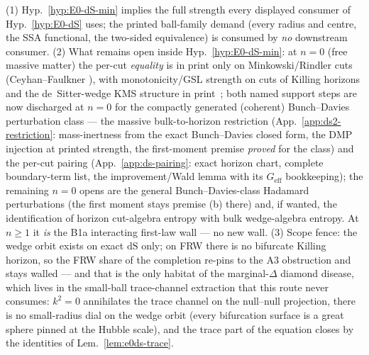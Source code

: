 \begin{remark}
\label{rem:e0ds-min-status}
(1) Hyp.~\ref{hyp:E0-dS-min} implies the full strength every
displayed consumer of Hyp.~\ref{hyp:E0-dS} uses; the printed
ball-family demand (every radius and centre, the SSA functional,
the two-sided equivalence) is consumed by \emph{no} downstream
consumer. (2) What remains open inside Hyp.~\ref{hyp:E0-dS-min}: at
$n{=}0$ (free massive matter) the per-cut \emph{equality} is in
print only on Minkowski/Rindler cuts (Ceyhan--Faulkner
\cite{CeyhanFaulkner2018}), with monotonicity/GSL strength on cuts
of Killing horizons \cite{FaulknerSperanza2024} and the
de~Sitter-wedge KMS structure in
print~\cite{BorchersBuchholz1999}; both named support steps are now
discharged at $n{=}0$ for the compactly generated (coherent)
Bunch--Davies perturbation class --- the massive bulk-to-horizon
restriction (App.~\ref{app:ds2-restriction}: mass-inertness from
the exact Bunch--Davies closed form, the DMP injection at printed
strength, the first-moment premise \emph{proved} for the class)
and the per-cut pairing (App.~\ref{app:ds-pairing}: exact horizon
chart, complete boundary-term list, the improvement/Wald lemma
with its $G_{\mathrm{eff}}$ bookkeeping); the remaining $n{=}0$
opens are the general Bunch--Davies-class Hadamard perturbations
(the first moment stays premise (b) there) and, if wanted, the
identification of horizon cut-algebra entropy with bulk
wedge-algebra entropy. At $n\ge1$ it
\emph{is} the B1a interacting first-law wall --- no new wall. (3)
Scope fence: the wedge orbit exists on exact $\mathrm{dS}$ only; on
FRW there is no bifurcate Killing horizon, so the FRW share of the
completion re-pins to the A3 obstruction and stays walled --- and
that is the only habitat of the marginal-$\Delta$ diamond disease,
which lives in the small-ball trace-channel extraction that this
route never consumes: $k^{2}=0$ annihilates the trace channel on
the null--null projection, there is no small-radius dial on the
wedge orbit (every bifurcation surface is a great sphere pinned at
the Hubble scale), and the trace part of the equation closes by the
identities of Lem.~\ref{lem:e0ds-trace}.
\end{remark}
